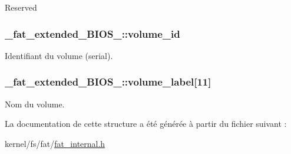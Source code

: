 Reserved \hypertarget{struct__fat__extended__BIOS__16_aa932fbe482a2da22749a6f9fa42fce59}{
\subsubsection[{volume\+\_\+id}]{ \+\_\+fat\+\_\+extended\+\_\+\+B\+I\+O\+S\+\_\+::volume\+\_\+id}}\label{struct__fat__extended__BIOS__16_aa932fbe482a2da22749a6f9fa42fce59}
Identifiant du volume (serial). \hypertarget{struct__fat__extended__BIOS__16_a0f859beb837eb3013ef4ad48dd0c9845}{
\subsubsection[{volume\+\_\+label}]{ \+\_\+fat\+\_\+extended\+\_\+\+B\+I\+O\+S\+\_\+::volume\+\_\+label\mbox{[}11\mbox{]}}}\label{struct__fat__extended__BIOS__16_a0f859beb837eb3013ef4ad48dd0c9845}
Nom du volume. 

La documentation de cette structure a été générée à partir du fichier suivant \+:\begin{DoxyCompactItemize}
\item 
kernel/fs/fat/\hyperlink{fat__internal_8h}{fat\+\_\+internal.\+h}\end{DoxyCompactItemize}
